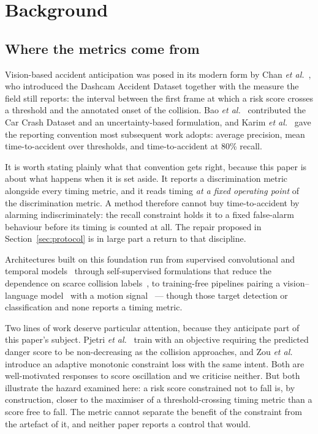\section{Background}
\label{sec:background}

\subsection{Where the metrics come from}

Vision-based accident anticipation was posed in its modern form by Chan
\textit{et al.}~\cite{chan2016dad}, who introduced the Dashcam Accident Dataset
together with the measure the field still reports: the interval between the
first frame at which a risk score crosses a threshold and the annotated onset
of the collision. Bao \textit{et al.}~\cite{bao2020ccd} contributed the Car
Crash Dataset and an uncertainty-based formulation, and Karim \textit{et
al.}~\cite{karim2022dsta} gave the reporting convention most subsequent work
adopts: average precision, mean time-to-accident over thresholds, and
time-to-accident at 80\% recall.

It is worth stating plainly what that convention gets right, because this paper
is about what happens when it is set aside. It reports a discrimination metric
alongside every timing metric, and it reads timing \emph{at a fixed operating
point} of the discrimination metric. A method therefore cannot buy
time-to-accident by alarming indiscriminately: the recall constraint holds it
to a fixed false-alarm behaviour before its timing is counted at all. The
repair proposed in Section~\ref{sec:protocol} is in large part a return to that
discipline.

Architectures built on this foundation run from supervised convolutional and
temporal models~\cite{chan2016dad, bao2020ccd, karim2022dsta} through
self-supervised formulations that reduce the dependence on scarce collision
labels~\cite{yao2019unsupervised, liu2026sctnet, zhong2025early}, to
training-free pipelines pairing a vision--language
model~\cite{radford2021clip} with a motion
signal~\cite{thakur2026modular, saha2026zeroshot, singh2026metadata} --- though
those target detection or classification and none reports a timing metric.

Two lines of work deserve particular attention, because they anticipate part of
this paper's subject. Pjetri \textit{et al.}~\cite{pjetri2025nondecreasing}
train with an objective requiring the predicted danger score to be
non-decreasing as the collision approaches, and Zou \textit{et
al.}~\cite{zou2026riskprop} introduce an adaptive monotonic constraint loss with
the same intent. Both are well-motivated responses to score oscillation and we
criticise neither. But both illustrate the hazard examined here: a risk score
constrained not to fall is, by construction, closer to the maximiser of a
threshold-crossing timing metric than a score free to fall. The metric cannot
separate the benefit of the constraint from the artefact of it, and neither
paper reports a control that would.

